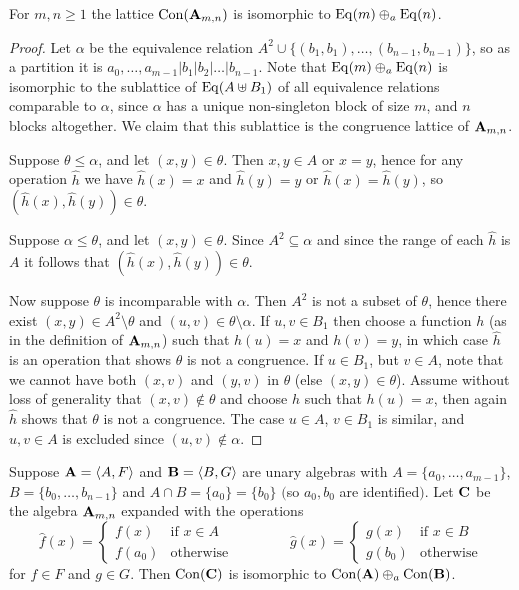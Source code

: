 \begin{lemma}
  For $m,n\ge 1$ the lattice $\mathrm{Con}(\mathbf A_{m,n})$ is isomorphic to
  $\operatorname{Eq}(m)\oplus_a \operatorname{Eq}(n)$. 
\end{lemma}
\begin{proof}
  Let $\alpha$ be the equivalence relation
  $A^2\cup\{(b_1,b_1),\dots,(b_{n-1},b_{n-1})\}$, so as a partition it is  
  $a_0,\dots,a_{m-1}|b_1|b_2|\dots|b_{n-1}$. 
  Note that $\operatorname{Eq}(m)\oplus_a \operatorname{Eq}(n)$ is isomorphic to the sublattice
  of $\operatorname{Eq}(A\uplus B_1)$ of all equivalence relations comparable to $\alpha$, since
  $\alpha$ has a unique non-singleton block of size $m$, and $n$ blocks
  altogether. We claim that this sublattice is the congruence lattice of $\mathbf
  A_{m,n}$.  

  Suppose $\theta\le\alpha$, and let $(x,y)\in\theta$. Then $x,y\in A$ or $x=y$,
  hence for any operation $\hat h$ we  have $\hat h(x)=x$ and $\hat h(y)=y$ or
  $\hat h(x)=\hat h(y)$, so $(\hat h(x),\hat h(y))\in\theta$. 

  Suppose $\alpha\le\theta$, and let $(x,y)\in\theta$. Since $A^2\subseteq\alpha$
  and since the range of each $\hat h$ is $A$ it follows that 
  $(\hat h(x),\hat h(y))\in\theta$. 

  Now suppose $\theta$ is incomparable with $\alpha$. Then $A^2$ is not a subset
  of $\theta$, hence there exist $(x,y)\in A^2\setminus\theta$ and
  $(u,v)\in\theta\setminus\alpha$. If $u,v\in B_1$ then choose a function $h$ (as
  in the definition of $\mathbf A_{m,n}$) such that $h(u)=x$ and $h(v)=y$, in which
  case $\hat h$ is an operation that shows $\theta$ is not a congruence. 
  If $u\in B_1$, but $v\in A$, note that we cannot have both $(x,v)$ and $(y,v)$
  in $\theta$ (else $(x,y)\in\theta$). Assume without loss of generality 
  that $(x,v)\notin\theta$ and choose $h$ such that $h(u)=x$, then again $\hat h$
  shows that $\theta$ is not a congruence. 
  The case $u\in A$, $v\in B_1$ is similar, and $u,v\in A$ is excluded since
  $(u,v)\notin\alpha$. 
\end{proof}


\begin{theorem}
  Suppose $\mathbf A=\langle A,F\rangle$ and $\mathbf B=\langle B,G\rangle$ are unary algebras with
  $A=\{a_0,\dots,a_{m-1}\}$, $B=\{b_0,\dots,b_{n-1}\}$ and 
  $A\cap B=\{a_0\}=\{b_0\}$ $($so $a_0,b_0$ are identified$)$. Let $\mathbf C$ be the
  algebra $\mathbf A_{m,n}$ expanded with the operations 
  $$
  \hat f(x)=\begin{cases}f(x)&\text{if $x\in A$}\\
  f(a_0)&\text{otherwise}\end{cases}\qquad\qquad
  \hat g(x)=\begin{cases}g(x)&\text{if $x\in B$}\\
  g(b_0)&\text{otherwise}\end{cases}
  $$
  for $f\in F$ and $g\in G$. Then $\mathrm{Con}(\mathbf C)$ is isomorphic to
  $\mathrm{Con}(\mathbf A)\oplus_a\mathrm{Con}(\mathbf B)$. 
\end{theorem}


